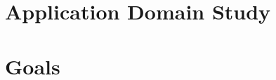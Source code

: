 

    \section{Application Domain Study}
    
    \section{}
    
    \section{Goals}
    
    \section{}


